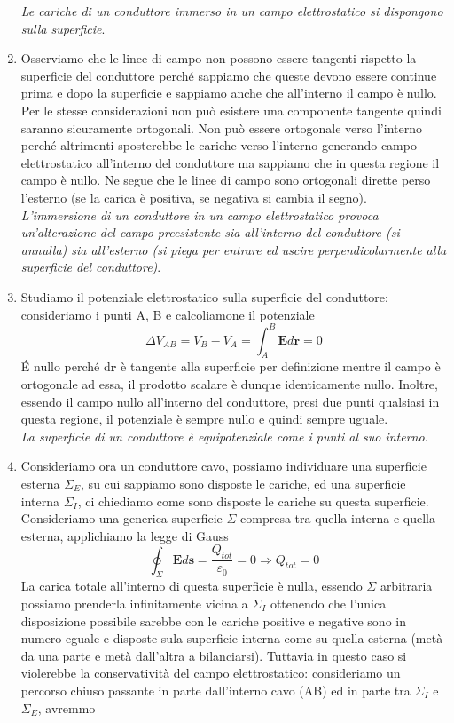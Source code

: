 \documentclass[
10pt, %
a4paper, %
oneside, %
headinclude,footinclude, %
BCOR5mm, %
]{scrartcl}
\begin{document}
\begin{enumerate}
\textit{Le cariche di un conduttore immerso in un campo elettrostatico si dispongono sulla superficie}.
\item Osserviamo che le linee di campo non possono essere tangenti rispetto la superficie del conduttore perché sappiamo che queste devono essere continue prima e dopo la superficie e sappiamo anche che all'interno il campo è nullo. Per le stesse considerazioni non può esistere una componente tangente quindi saranno sicuramente ortogonali. Non può essere ortogonale verso l'interno perché altrimenti sposterebbe le cariche verso l'interno generando campo elettrostatico all'interno del conduttore ma sappiamo che in questa regione il campo è nullo. Ne segue che le linee di campo sono ortogonali dirette perso l'esterno (se la carica è positiva, se negativa si cambia il segno).\\
\textit{L'immersione di un conduttore in un campo elettrostatico provoca un'alterazione del campo preesistente sia all'interno del conduttore (si annulla) sia all'esterno (si piega per entrare ed uscire perpendicolarmente alla superficie del conduttore)}.
\item Studiamo il potenziale elettrostatico sulla superficie del conduttore: consideriamo i punti A, B e calcoliamone il potenziale
\[\Delta V_{AB} = V_B - V_A = \int_A^B \mathbf{E}d\mathbf{r} = 0\]
\'E nullo perché d$\mathbf{r}$ è tangente alla superficie per definizione mentre il campo è ortogonale ad essa, il prodotto scalare è dunque identicamente nullo. Inoltre, essendo il campo nullo all'interno del conduttore, presi due punti qualsiasi in questa regione, il potenziale è sempre nullo e quindi sempre uguale.\\
\textit{La superficie di un conduttore è equipotenziale come i punti al suo interno}.
\item Consideriamo ora un conduttore cavo, possiamo individuare una superficie esterna $\Sigma_E$, su cui sappiamo sono disposte le cariche, ed una superficie interna $\Sigma_I$, ci chiediamo come sono disposte le cariche su questa superficie. Consideriamo una generica superficie $\Sigma$ compresa tra quella interna e quella esterna, applichiamo la legge di Gauss
\[\oint_\Sigma \mathbf{E}d\mathbf{s} = \frac{Q_{tot}}{\varepsilon_0} = 0 \Rightarrow Q_{tot} = 0\]
La carica totale all'interno di questa superficie è nulla, essendo $\Sigma$ arbitraria possiamo prenderla infinitamente vicina a $\Sigma_I$ ottenendo che l'unica disposizione possibile sarebbe con le cariche positive e negative sono in numero eguale e disposte sula superficie interna come su quella esterna (metà da una parte e metà dall'altra a bilanciarsi). Tuttavia in questo caso si violerebbe la conservatività del campo elettrostatico: consideriamo un percorso chiuso passante in parte dall'interno cavo (AB) ed in parte tra $\Sigma_I$ e $\Sigma_E$, avremmo

\end{enumerate}
\end{document}
